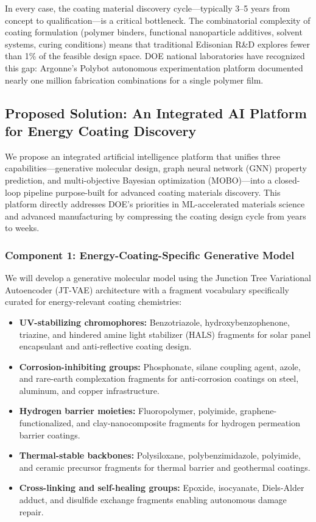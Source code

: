 \documentclass[11pt,letterpaper]{article}
\begin{document}
In every case, the coating material discovery cycle---typically 3--5 years from concept to qualification---is a critical bottleneck. The combinatorial complexity of coating formulation (polymer binders, functional nanoparticle additives, solvent systems, curing conditions) means that traditional Edisonian R\&D explores fewer than 1\% of the feasible design space. DOE national laboratories have recognized this gap: Argonne's Polybot autonomous experimentation platform documented nearly one million fabrication combinations for a single polymer film.

\subsection{Proposed Solution: An Integrated AI Platform for Energy Coating Discovery}

We propose an integrated artificial intelligence platform that unifies three capabilities---generative molecular design, graph neural network (GNN) property prediction, and multi-objective Bayesian optimization (MOBO)---into a closed-loop pipeline purpose-built for advanced coating materials discovery. This platform directly addresses DOE's priorities in ML-accelerated materials science and advanced manufacturing by compressing the coating design cycle from years to weeks.

\subsubsection{Component 1: Energy-Coating-Specific Generative Model}

We will develop a generative molecular model using the Junction Tree Variational Autoencoder (JT-VAE) architecture with a fragment vocabulary specifically curated for energy-relevant coating chemistries:

\begin{itemize}[noitemsep]
  \item \textbf{UV-stabilizing chromophores:} Benzotriazole, hydroxybenzophenone, triazine, and hindered amine light stabilizer (HALS) fragments for solar panel encapsulant and anti-reflective coating design.
  \item \textbf{Corrosion-inhibiting groups:} Phosphonate, silane coupling agent, azole, and rare-earth complexation fragments for anti-corrosion coatings on steel, aluminum, and copper infrastructure.
  \item \textbf{Hydrogen barrier moieties:} Fluoropolymer, polyimide, graphene-functionalized, and clay-nanocomposite fragments for hydrogen permeation barrier coatings.
  \item \textbf{Thermal-stable backbones:} Polysiloxane, polybenzimidazole, polyimide, and ceramic precursor fragments for thermal barrier and geothermal coatings.
  \item \textbf{Cross-linking and self-healing groups:} Epoxide, isocyanate, Diels-Alder adduct, and disulfide exchange fragments enabling autonomous damage repair.
\end{itemize}
\end{document}
